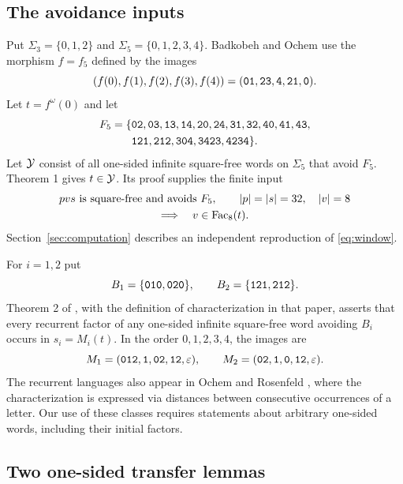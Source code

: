 \subsection{The avoidance inputs}

Put \(\Sigma_3=\{0,1,2\}\) and \(\Sigma_5=\{0,1,2,3,4\}\).
Badkobeh and Ochem \cite[Theorems 1 and 2]{BO} use the morphism
\(f=f_5\) defined by the images
\[
(f(0),f(1),f(2),f(3),f(4))
=(\mathtt{01},\mathtt{23},\mathtt{4},\mathtt{21},\mathtt{0}).
\]
Let \(t=f^\omega(0)\) and let
\[
\begin{split}
F_5=\{&
\mathtt{02},\mathtt{03},\mathtt{13},\mathtt{14},\mathtt{20},\mathtt{24},
\mathtt{31},\mathtt{32},\mathtt{40},\mathtt{41},\mathtt{43},\\
&\mathtt{121},\mathtt{212},\mathtt{304},\mathtt{3423},\mathtt{4234}\}.
\end{split}
\]
Let \(\mathcal Y\) consist of all one-sided infinite square-free words on
\(\Sigma_5\) that avoid \(F_5\). Theorem 1 gives \(t\in\mathcal Y\). Its proof
supplies the finite input
\begin{equation}\label{eq:window}
\begin{gathered}
pvs\text{ is square-free and avoids }F_5,\qquad
|p|=|s|=32,\quad |v|=8\\
\Longrightarrow\quad v\in\operatorname{Fac}_8(t).
\end{gathered}
\end{equation}
Section~\ref{sec:computation} describes an independent reproduction
of \eqref{eq:window}.

For \(i=1,2\) put
\[
B_1=\{\mathtt{010},\mathtt{020}\},\qquad
B_2=\{\mathtt{121},\mathtt{212}\}.
\]
Theorem 2 of \cite{BO}, with the definition of characterization
in that paper, asserts that every recurrent factor of any one-sided
infinite square-free word avoiding \(B_i\) occurs in \(s_i=M_i(t)\).
In the order \(0,1,2,3,4\), the images are
\[
M_1=(\mathtt{012},\mathtt{1},\mathtt{02},\mathtt{12},\varepsilon),\qquad
M_2=(\mathtt{02},\mathtt{1},\mathtt{0},\mathtt{12},\varepsilon).
\]
The recurrent languages also appear in Ochem and Rosenfeld
\cite[Theorems 2 and 3]{OR}, where the characterization is expressed
via distances between consecutive occurrences of a letter. Our use
of these classes requires statements about arbitrary one-sided words,
including their initial factors.

\subsection{Two one-sided transfer lemmas}\label{sec:lifting}

